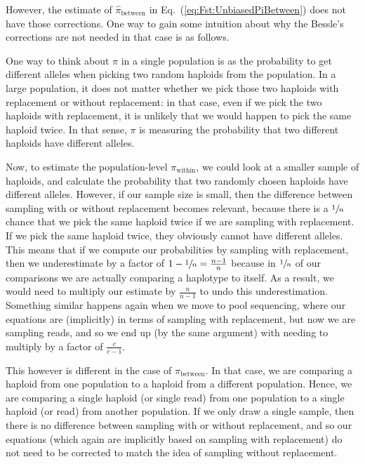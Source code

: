 \documentclass[letterpaper,fontsize=9pt,DIV=12]{scrartcl}
\newcommand\eqnref[1]{Eq.~(\ref{#1})}
\begin{document}
However, the estimate of $\widehat{\pi}_\text{between}$ in \eqnref{eq:Fst:UnbiasedPiBetween} does not have those corrections. One way to gain some intuition about why the Bessle's corrections are not needed in that case is as follows.

One way to think about $\pi$ in a single population is as the probability to get different alleles when picking two random haploids from the population.  In a large population, it does not matter whether we pick those two haploids with replacement or without replacement: in that case, even if we pick the two haploids with replacement, it is unlikely that we would happen to pick the same haploid twice.  In that sense, $\pi$ is measuring the probability that two different haploids have different alleles.  
 
Now, to estimate the population-level $\pi_\text{within}$, we could look at a smaller sample of haploids, and calculate the probability that two randomly chosen haploids have different alleles. However, if our sample size is small, then the difference between sampling with or without replacement becomes relevant, because there is a $\sfrac{1}{n}$ chance that we pick the same haploid twice if we are sampling with replacement. If we pick the same haploid twice, they obviously cannot have different alleles.  This means that if we compute our probabilities by sampling with replacement, then we underestimate by a factor of $1 - \sfrac{1}{n} = \frac{n-1}{n}$ because in $\sfrac{1}{n}$ of our comparisons we are actually comparing a haplotype to itself.  As a result, we would need to multiply our estimate by $\frac{n}{n-1}$ to undo this underestimation.  Something similar happens again when we move to pool sequencing, where our equations are (implicitly) in terms of sampling with replacement, but now we are sampling reads, and so we end up (by the same argument) with needing to multiply by a factor of $\frac{c}{c-1}$.  

This however is different in the case of $\pi_\text{between}$.  In that case, we are comparing a haploid from one population to a haploid from a different population.  Hence, we are comparing a single haploid (or single read) from one population to a single haploid (or read) from another population.  If we only draw a single sample, then there is no difference between sampling with or without replacement, and so our equations (which again are implicitly based on sampling with replacement) do not need to be corrected to match the idea of sampling without replacement.  
\end{document}
